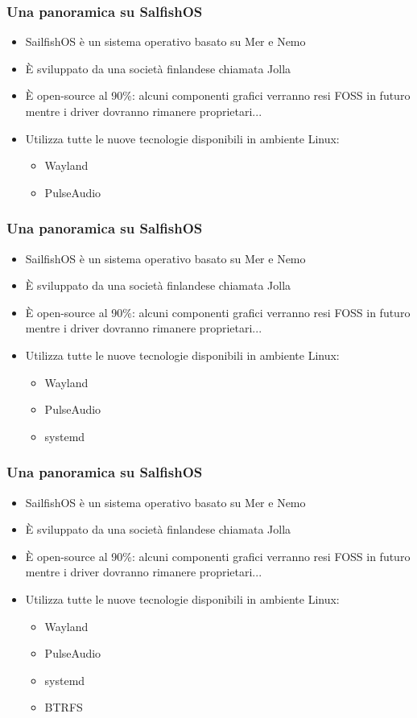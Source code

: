 \documentclass[12pt]{beamer}
\begin{document}
\begin{frame}
\frametitle{Una panoramica su SalfishOS}
\begin{itemize}
\item SailfishOS è un sistema operativo basato su Mer e Nemo
\item È sviluppato da una società finlandese chiamata Jolla
\item È open-source al 90\%: alcuni componenti grafici verranno resi FOSS in futuro mentre i driver dovranno rimanere proprietari...
\item Utilizza tutte le nuove tecnologie disponibili in ambiente Linux:
\begin{itemize}
\item Wayland
\item PulseAudio
\end{itemize}
\end{itemize}
\end{frame}
\begin{frame}
\frametitle{Una panoramica su SalfishOS}
\begin{itemize}
\item SailfishOS è un sistema operativo basato su Mer e Nemo
\item È sviluppato da una società finlandese chiamata Jolla
\item È open-source al 90\%: alcuni componenti grafici verranno resi FOSS in futuro mentre i driver dovranno rimanere proprietari...
\item Utilizza tutte le nuove tecnologie disponibili in ambiente Linux:
\begin{itemize}
\item Wayland
\item PulseAudio
\item systemd
\end{itemize}
\end{itemize}
\end{frame}
\begin{frame}
\frametitle{Una panoramica su SalfishOS}
\begin{itemize}
\item SailfishOS è un sistema operativo basato su Mer e Nemo
\item È sviluppato da una società finlandese chiamata Jolla
\item È open-source al 90\%: alcuni componenti grafici verranno resi FOSS in futuro mentre i driver dovranno rimanere proprietari...
\item Utilizza tutte le nuove tecnologie disponibili in ambiente Linux:
\begin{itemize}
\item Wayland
\item PulseAudio
\item systemd
\item BTRFS
\end{itemize}
\end{itemize}
\end{frame}
\end{document}
